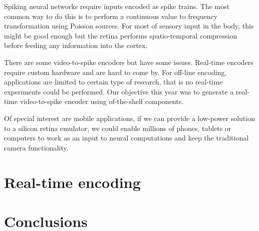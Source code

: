 Spiking neural networks require inputs encoded as spike trains. The most common way to do this is to perform a continuous value to frequency transformation using Poisson sources. For most of sensory input in the body, this might be good enough but the retina performs spatio-temporal compression before feeding any information into the cortex.

There are some video-to-spike encoders but have some issues. Real-time encoders require custom hardware and are hard to come by. For off-line encoding, applications are limited to certain type of research, that is no real-time experiments could be performed. Our objective this year was to generate a real-time video-to-spike encoder using of-the-shelf components. 

Of special interest are mobile applications, if we can provide a low-power solution to a silicon retina emulator, we could enable millions of phones, tablets or computers to work as an input to neural computations and keep the traditional camera functionality.

\section{Real-time encoding}

%

%
\section{Conclusions}
